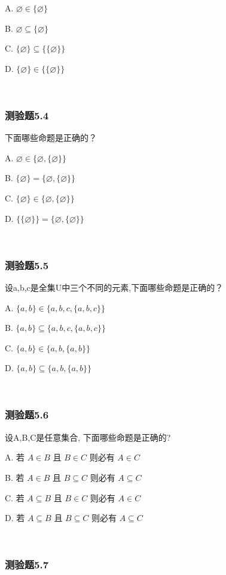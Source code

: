 \documentclass[UTF8, heading=true]{ctexart}
\begin{document}
A. 
$
\varnothing \in\{\varnothing\}
$

B. 
$
\varnothing \subseteq\{\varnothing\}
$

C. 
$
\{\varnothing\} \subseteq\{\{\varnothing\}\}
$

D. 
$
\{\varnothing\} \in\{\{\varnothing\}\}
$

\textcolor{white}{答案：ABD}


\subsubsection{测验题5.4}
下面哪些命题是正确的？

A. $\varnothing \in\{\varnothing,\{\varnothing\}\}$

B. $\{\varnothing\}=\{\varnothing,\{\varnothing\}\}$

C. $\{\varnothing\} \in\{\varnothing,\{\varnothing\}\}$

D. $\{\{\varnothing\}\}=\{\varnothing,\{\varnothing\}\}$

\textcolor{white}{答案：AC}

\subsubsection{测验题5.5}
设a,b,c是全集U中三个不同的元素,下面哪些命题是正确的？

A. $\{a, b\} \in\{a, b, c,\{a, b, c\}\}$

B. $\{a, b\} \subseteq\{a, b, c,\{a, b, c\}\}$

C. $\{a, b\} \in\{a, b,\{a, b\}\}$

D. $\{a, b\} \subseteq\{a, b,\{a, b\}\}$

\textcolor{white}{答案：BCD}

\subsubsection{测验题5.6}
设A,B,C是任意集合, 下面哪些命题是正确的?

A. 
若 $A \in B$ 且 $B \in C$ 则必有 $A \in C$

B. 
若 $A \in B$ 且 $B \subseteq C$ 则必有 $A \subseteq C$

C. 
若 $A \subseteq B$ 且 $B \in C$ 则必有 $A \in C$

D. 
若 $A \subseteq B$ 且 $B \subseteq C$ 则必有 $A \subseteq C$

\textcolor{white}{答案：D}

\subsubsection{测验题5.7}
\end{document}
